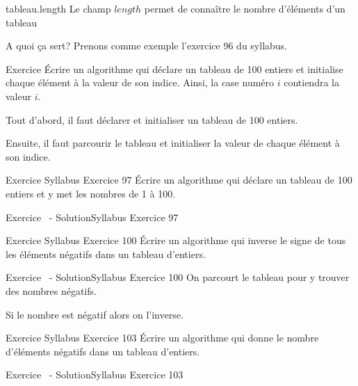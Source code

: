 \begin{frame}{tableau.length}
    \pause
    Le champ $length$ permet de connaître le nombre d'éléments d'un tableau
    
\end{frame}

\begin{frame}{A quoi ça sert?}
    \pause
    Prenons comme exemple l'exercice 96 du syllabus.
    \begin{block}{Exercice}
        Écrire un algorithme qui déclare un tableau de 100 entiers
        et initialise chaque élément à la valeur de son indice.
        Ainsi, la case numéro $i$ contiendra la valeur $i$.
    \end{block}

    \pause
    Tout d'abord, il faut déclarer et initialiser un tableau de 100 entiers.
    

    \pause
    Ensuite, il faut parcourir le tableau et initialiser la valeur de chaque élément à son indice.
    
\end{frame}

\begin{frame}{Exercice \theexercice}{Syllabus Exercice 97}
    Écrire un algorithme qui déclare un tableau de 100 entiers
    et y met les nombres de 1 à 100.
\end{frame}

\begin{frame}{Exercice \theexercice~- Solution}{Syllabus Exercice 97}
    
\end{frame}

\begin{frame}{Exercice \theexercice}{Syllabus Exercice 100}
    Écrire un algorithme qui
    inverse le signe de tous les éléments négatifs dans un tableau d’entiers.
\end{frame}

\begin{frame}{Exercice \theexercice~- Solution}{Syllabus Exercice 100}
    On parcourt le tableau pour y trouver des nombres négatifs.
    
    Si le nombre est négatif alors on l'inverse.
\end{frame}

\begin{frame}{Exercice \theexercice}{Syllabus Exercice 103}
    Écrire un algorithme qui
    donne le nombre d’éléments négatifs dans un tableau d’entiers.
\end{frame}

\begin{frame}{Exercice \theexercice~- Solution}{Syllabus Exercice 103}
    
\end{frame}